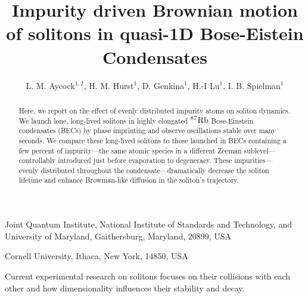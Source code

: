 \documentclass{nature}
\title{Impurity driven Brownian motion of solitons in quasi-1D Bose-Eistein Condensates}
\author{ L. M. Aycock$^{1,2}$, H. M. Hurst$^1$,  D. Genkina$^1$, H.-I Lu$^{1}$, I. B. Spielman$^1$}
\def\Rb87{^{87}\rm{Rb}}					%
\begin{document}
\maketitle
\begin{affiliations}
 \item Joint Quantum Institute, National Institute of Standards and Technology, and University of Maryland, Gaithersburg, Maryland, 20899, USA
 \item Cornell University, Ithaca, New York, 14850, USA
\end{affiliations}

\begin{abstract}
Here, we report on the effect of evenly distributed impurity atoms on soliton dynamics. We launch lone, long-lived solitons in highly elongated $\Rb87$ Bose-Einstein condensates (BECs) by phase imprinting and observe oscillations stable over many seconds. We compare these long-lived solitons to those launched in BECs containing a few percent of impurity---the same atomic species in a different Zeeman sublevel---controllably introduced just before evaporation to degeneracy. These impurities---evenly distributed throughout the condensate---dramatically decrease the soliton lifetime and enhance Brownian-like diffusion in the soliton's trajectory.
\end{abstract}

Current experimental research on solitons focuses on their collisions with each other\cite{Becker2013,Weller2008} and how dimensionality influences their stability and decay\cite{Ku2014}.
\end{document}
